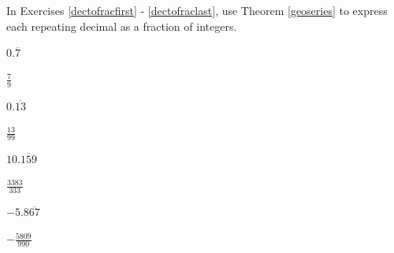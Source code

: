 \documentclass{ximera}
\begin{document}
\begin{question}
    

In Exercises \ref{dectofracfirst} - \ref{dectofraclast}, use Theorem \ref{geoseries} to express each repeating decimal as a fraction of integers.

\begin{problem}\label{dectofracfirst}
$0.\overline{7}$ 

\begin{solution}
$\frac{7}{9}$
\end{solution}
\end{problem}

\begin{problem}
$0.\overline{13}$

\begin{solution}
$\frac{13}{99}$
\end{solution}
\end{problem}

\begin{problem}
$10.\overline{159}$

\begin{solution}
$\frac{3383}{333}$
\end{solution}
\end{problem} 

\begin{problem}\label{dectofraclast}
$-5.8\overline{67}$

\begin{solution}
$-\frac{5809}{990}$
\end{solution}
\end{problem}

\end{question}
\end{document}
